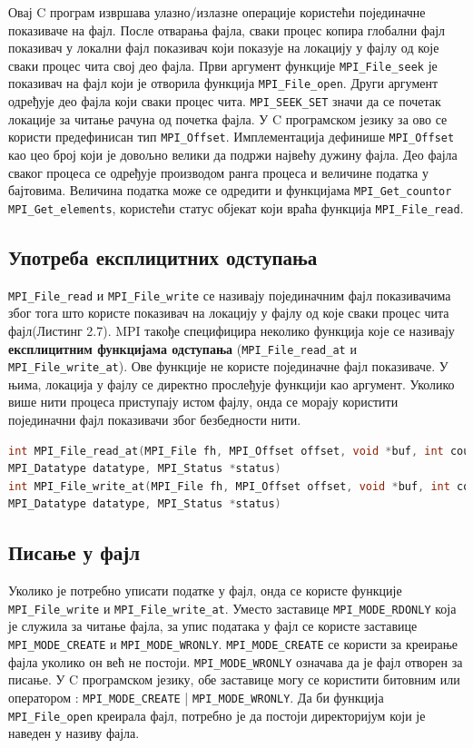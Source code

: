 Овај C програм извршава улазно/излазне операције користећи појединачне показиваче на фајл. После отварања фајла, сваки процес копира глобални фајл показивач у локални фајл показивач који показује на локацију у фајлу од које сваки процес чита свој део фајла. Први аргумент функције \texttt{MPI\_File\_seek} је показивач на фајл који је отворила функција 
\texttt{MPI\_File\_open}. Други аргумент одређује део фајла који сваки процес чита. \texttt{MPI\_SEEK\_SET} значи да се почетак локације за читање рачуна од почетка фајла. У C програмском језику 
за ово се користи предефинисан тип \texttt{MPI\_Offset}. Имплементација дефинише \texttt{MPI\_Offset} као цео број који је довољно велики да подржи највећу дужину фајла. Део фајла сваког процеса се одређује производом ранга процеса и величине податка у бајтовима. Величина податка може се одредити и функцијама \texttt{MPI\_Get\_countor} \texttt{MPI\_Get\_elements}, користећи статус објекат који враћа функција \texttt{MPI\_File\_read}.


\subsection{Употреба експлицитних одступања}

\texttt{MPI\_File\_read} и \texttt{MPI\_File\_write} се називају појединачним фајл показивачима због тога што користе показивач на локацију у фајлу од које сваки процес чита фајл(Листинг 2.7). MPI такође специфицира  неколико функција које се називају \textbf{експлицитним функцијама одступања} (\texttt{MPI\_File\_read\_at} и \texttt{MPI\_File\_write\_at}). Ове функције не користе појединачне фајл показиваче. У њима, локација у фајлу се директно прослеђује функцији као аргумент. Уколико више нити процеса приступају истом фајлу, онда се морају користити појединачни фајл показивачи због безбедности нити.

\begin{lstlisting}[style=nonumbers,frame=single,language=C, caption= MPI функције]
int MPI_File_read_at(MPI_File fh, MPI_Offset offset, void *buf, int count,
MPI_Datatype datatype, MPI_Status *status)
int MPI_File_write_at(MPI_File fh, MPI_Offset offset, void *buf, int count,
MPI_Datatype datatype, MPI_Status *status)
\end{lstlisting}

\subsection{Писање у фајл}
Уколико је потребно уписати податке у фајл, онда се користе функције \texttt{MPI\_File\_write} и \texttt{MPI\_File\_write\_at}. Уместо заставице \texttt{MPI\_MODE\_RDONLY} која је служила за читање фајла, за упис података у фајл се користе заставице \texttt{MPI\_MODE\_CREATE} и \texttt{MPI\_MODE\_WRONLY}. \texttt{MPI\_MODE\_CREATE} се користи за креирање фајла уколико он већ не постоји. \texttt{MPI\_MODE\_WRONLY} означава да је фајл отворен за писање. У C програмском језику, обе заставице могу се користити битовним или оператором :  \texttt{MPI\_MODE\_CREATE} | \texttt{MPI\_MODE\_WRONLY}. Да би функција \texttt{MPI\_File\_open} креирала фајл, потребно је да постоји директоријум који је наведен у називу фајла.

